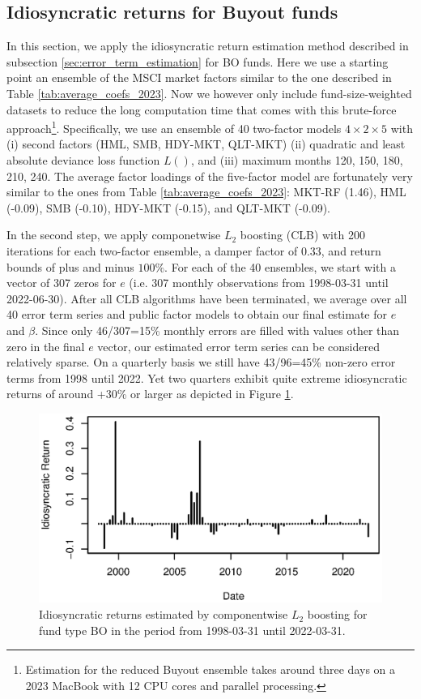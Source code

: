 \documentclass[12pt]{article}
\begin{document}
\subsection{Idiosyncratic returns for Buyout funds}
\label{sec:idiosyncratic_BO}

In this section, we apply the idiosyncratic return estimation method described in subsection \ref{sec:error_term_estimation} for BO funds.
Here we use a starting point an ensemble of the MSCI market factors similar to the one described in Table \ref{tab:average_coefs_2023}.
Now we however only include fund-size-weighted datasets to reduce the long computation time that comes with this brute-force approach\footnote{Estimation for the reduced Buyout ensemble takes around three days on a 2023 MacBook with 12 CPU cores and parallel processing.}.
Specifically, we use an ensemble of 40 two-factor models $4 \times 2 \times 5$  with (i) second factors (HML, SMB, HDY-MKT, QLT-MKT) (ii) quadratic and least absolute deviance loss function $L()$, and (iii) maximum months 120, 150, 180, 210, 240.
The average factor loadings of the five-factor model are fortunately very similar to the ones from Table \ref{tab:average_coefs_2023}:  
MKT-RF (1.46), 
HML (-0.09), 
SMB (-0.10), 
HDY-MKT (-0.15), and 
QLT-MKT (-0.09).

In the second step, we apply componetwise $L_2$ boosting (CLB) with 200 iterations for each two-factor ensemble, a damper factor of 0.33, and return bounds of plus and minus $100\%$.
For each of the 40 ensembles, we start with a vector of 307 zeros for $e$  (i.e. 307 monthly observations from 1998-03-31 until 2022-06-30).
After all CLB algorithms have been terminated, we average over all 40 error term series and public factor models to obtain our final estimate for $e$ and $\beta$.
Since only 46/307=15\% monthly errors are filled with values other than zero in the final $e$ vector, our estimated error term series can be considered relatively sparse.
On a quarterly basis we still have 43/96=45\% non-zero error terms from 1998 until 2022.
Yet two quarters exhibit quite extreme idiosyncratic returns of around +30\% or larger as depicted in Figure \ref{fig:clb_idio}.

\begin{figure}[H]
	\centering
	\includegraphics{Figures/msci_market_factors/XErrorSeriesBO}
	\caption{Idiosyncratic returns estimated by componentwise $L_2$ boosting for fund type BO in the period from 1998-03-31 until 2022-03-31.}
	\label{fig:clb_idio}
\end{figure}
\end{document}
